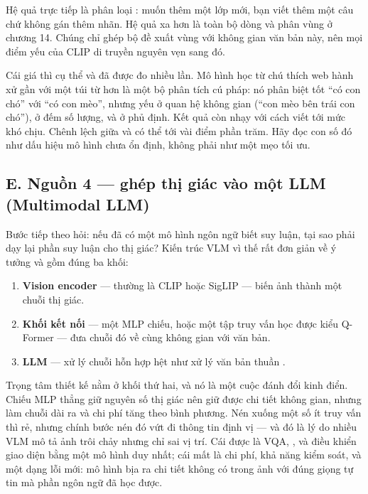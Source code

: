 \documentclass[../../../deep_learning.tex]{subfiles}
\begin{document}
Hệ quả trực tiếp là phân loại : muốn thêm một lớp mới, bạn viết thêm một câu chứ không gán thêm nhãn. Hệ quả xa hơn là toàn bộ dòng  và phân vùng ở chương 14. Chúng chỉ ghép bộ đề xuất vùng với không gian  văn bản này, nên mọi điểm yếu của CLIP di truyền nguyên vẹn sang đó.


Cái giá thì cụ thể và đã được đo nhiều lần. Mô hình học từ chú thích web hành xử gần với một túi từ hơn là một bộ phân tích cú pháp: nó phân biệt tốt ``có con chó'' với ``có con mèo'', nhưng yếu ở quan hệ không gian (``con mèo bên trái con chó''), ở đếm số lượng, và ở phủ định. Kết quả  còn nhạy với cách viết  tới mức khó chịu. Chênh lệch giữa  và  có thể tới vài điểm phần trăm. Hãy đọc con số đó như dấu hiệu mô hình chưa ổn định, không phải như một mẹo tối ưu.

\subsection{E. Nguồn 4 --- ghép thị giác vào một LLM (Multimodal LLM)}
Bước tiếp theo hỏi: nếu đã có một mô hình ngôn ngữ biết suy luận, tại sao phải dạy lại phần suy luận cho thị giác? Kiến trúc VLM vì thế rất đơn giản về ý tưởng và gồm đúng ba khối:

\begin{enumerate}
\item \textbf{Vision encoder} --- thường là CLIP hoặc SigLIP --- biến ảnh thành một chuỗi  thị giác.
\item \textbf{Khối kết nối} --- một MLP chiếu, hoặc một tập truy vấn học được kiểu Q-Former \cite{li2023blip2} --- đưa chuỗi đó về cùng không gian với  văn bản.
\item \textbf{LLM} --- xử lý chuỗi hỗn hợp hệt như xử lý văn bản thuần \cite{liu2023llava}.
\end{enumerate}

Trọng tâm thiết kế nằm ở khối thứ hai, và nó là một cuộc đánh đổi kinh điển. Chiếu MLP thẳng giữ nguyên số  thị giác nên giữ được chi tiết không gian, nhưng làm chuỗi dài ra và chi phí  tăng theo bình phương. Nén xuống một số ít  truy vấn thì rẻ, nhưng chính bước nén đó vứt đi thông tin định vị --- và đó là lý do nhiều VLM mô tả ảnh trôi chảy nhưng chỉ sai vị trí. Cái được là VQA, ,  và điều khiển giao diện bằng một mô hình duy nhất; cái mất là chi phí, khả năng kiểm soát, và một dạng lỗi mới: mô hình bịa ra chi tiết không có trong ảnh với đúng giọng tự tin mà phần ngôn ngữ đã học được.
\end{document}
